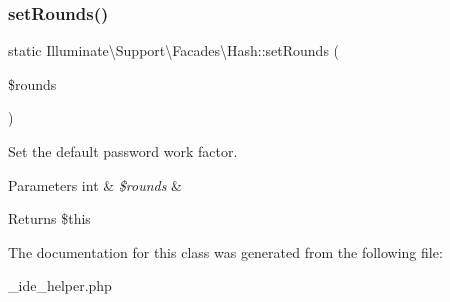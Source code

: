 \subsubsection{\texorpdfstring{set\+Rounds()}{setRounds()}}
{\footnotesize\ttfamily static Illuminate\textbackslash{}\+Support\textbackslash{}\+Facades\textbackslash{}\+Hash\+::set\+Rounds (\begin{DoxyParamCaption}\item[{}]{\$rounds }\end{DoxyParamCaption})\hspace{0.3cm}{\ttfamily [static]}}

Set the default password work factor.


\begin{DoxyParams}[1]{Parameters}
int & {\em \$rounds} & \\
\hline
\end{DoxyParams}
\begin{DoxyReturn}{Returns}
\$this 
\end{DoxyReturn}


The documentation for this class was generated from the following file\+:\begin{DoxyCompactItemize}
\item 
\+\_\+ide\+\_\+helper.\+php\end{DoxyCompactItemize}
